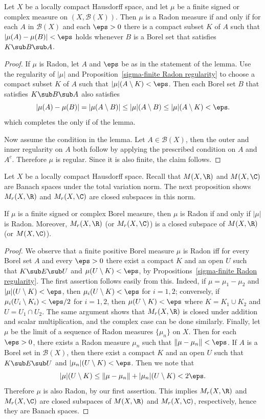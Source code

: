 \begin{proposition}\label{Radon signed inner compact approximate}
Let $X$ be a locally compact Hausdorff space, and let $\mu$ be a finite signed or complex measure on $(X,\mathcal{B}(X))$. Then $\mu$ is a Radon measure if and only if for each $A$ in $\mathcal{B}(X)$ and each $\eps>0$ there is a compact subset $K$ of $A$ such that $|\mu(A)-\mu(B)|<\eps$ holds whenever $B$ is a Borel set that satisfies $K\sub B\sub A$.
\end{proposition}
\begin{proof}
If $\mu$ is Radon, let $A$ and $\eps$ be as in the statement of the lemma. Use the regularity of $|\mu|$ and Proposition~\ref{sigma-finite Radon regularity} to choose a compact subset $K$ of $A$ such that $|\mu|(A\setminus K)<\eps$. Then each Borel set $B$ that satisfies $K\sub B\sub A$ also satisfies
\[|\mu(A)-\mu(B)|=|\mu(A\setminus B)|\leq|\mu|(A\setminus B)\leq|\mu|(A\setminus K)<\eps.\]
which completes the only if of the lemma.\par
Now assume the condition in the lemma. Let $A\in\mathcal{B}(X)$, then the outer and inner regularity on $A$ both follow by applying the prescribed condition on $A$ and $A^c$. Therefore $\mu$ is regular. Since it is also finite, the claim follows.
\end{proof}
Let $X$ be a locally compact Hausdorff space. Recall that $M(X,\R)$ and $M(X,\C)$ are Banach spaces under the total variation norm. The next proposition shows $M_r(X,\R)$ and $M_r(X,\C)$ are closed subspaces in this norm.
\begin{proposition}
If $\mu$ is a finite signed or complex Borel measure, then $\mu$ is Radon if and only if $|\mu|$ is Radon. Moreover, $M_r(X,\R)$ (or $M_r(X,\C)$) is a closed subspace of $M(X,\R)$ (or $M(X,\C)$).
\end{proposition}
\begin{proof}
We observe that a finite positive Borel measure $\mu$ is Radon iff for every Borel set $A$ and every $\eps>0$ there exist a compact $K$ and an open $U$ such that $K\sub E\sub U$ and $\mu(U\setminus K)<\eps$, by Propositions~\ref{sigma-finite Radon regularity}. The first assertion
follows easily from this. Indeed, if $\mu=\mu_1-\mu_2$ and $|\mu|(U\setminus K)<\eps$, then $\mu_i(U\setminus K)<\eps$ for $i=1,2$; conversely, if $\mu_i(U_i\setminus K_i)<\eps/2$ for $i=1,2$, then $\mu(U\setminus K)<\eps$ where $K=K_1\cup K_2$ and $U=U_1\cap U_2$. The same argument shows that $M_r(X,\R)$ is closed under addition and scalar multiplication, and the complex case can be done similarly. Finally, let $\mu$ be the limit of a sequence of Radon measures $\{\mu_n\}$ on $X$. Then for each $\eps>0$, there exists a Radon measure $\mu_n$ such that $\|\mu-\mu_n\|<\eps$. If $A$ is a Borel set in $\mathcal{B}(X)$, then there exist a compact $K$ and an open $U$ such that $K\sub E\sub U$ and $|\mu_n|(U\setminus K)<\eps$. Then we note that
\[|\mu|(U\setminus K)\leq\|\mu-\mu_n\|+|\mu_n|(U\setminus K)<2\eps.\]
Therefore $\mu$ is also Radon, by our first assertion. This implies $M_r(X,\R)$ and $M_r(X,\C)$ are closed subspaces of $M(X,\R)$ and $M_r(X,\C)$, respectively, hence they are Banach spaces.
\end{proof}

